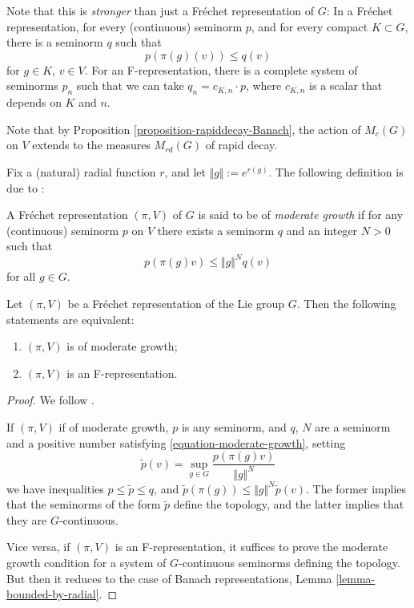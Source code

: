 Note that this is {\it stronger} than just a Fr\'echet representation of $G$: In a Fr\'echet representation, for every (continuous) seminorm $p$, and for every compact $K\subset G$, there is a seminorm $q$ such that 
$$ p(\pi(g) (v)) \le q(v)$$
for $g\in K$, $v\in V$. For an F-representation, there is a complete system of seminorms $p_n$ such that we can take $q_n=c_{K,n}\cdot p$, where $c_{K,n}$ is a scalar that depends on $K$ and $n$.

Note that by Proposition \ref{proposition-rapiddecay-Banach}, the action of $M_c(G)$ on $V$ extends to the measures $M_{rd}(G)$ of rapid decay. 

Fix a (natural) radial function $r$, and let $\Vert g\Vert:= e^{r(g)}$. The following definition is due to \cite{Casselman-canonicalextensions}:

\begin{definition}
\label{definition-moderate-growth}
A Fr\'echet representation $(\pi,V)$ of $G$ is said to be of {\it moderate
growth} if for any (continuous) seminorm $p$ on $V$ there exists a seminorm $q$
and an integer $N > 0$ such that
\begin{equation}
\label{equation-moderate-growth}
p(\pi(g)v) \le \Vert g\Vert^N q(v)
\end{equation}
for all $g \in G$.
\end{definition}

\begin{lemma}
\label{lemma-F-moderate-growth} 
 Let $(\pi, V)$ be a Fr\'echet representation of the Lie group
$G$. Then the following statements are equivalent:
\begin{enumerate}
 \item  $(\pi,V)$ is of moderate growth;
 \item $(\pi, V)$ is an F-representation.
\end{enumerate}
\end{lemma}

\begin{proof}
We follow \cite[Lemma 2.10]{Bernstein-Kroetz}.

If $(\pi, V)$ if of moderate growth, $p$ is any seminorm, and $q$, $N$ are a seminorm and a positive number satisfying \eqref{equation-moderate-growth}, setting 
$$ \tilde p (v) = \sup_{g\in G} \frac{p(\pi(g)v)}{\Vert g\Vert^N}$$ 
we have inequalities $p\le \tilde p\le q$, and $\tilde p(\pi(g)) \le \Vert g\Vert^N \tilde p(v)$. The former implies that the seminorms of the form $\tilde p$ define the topology, and the latter implies that they are $G$-continuous.

Vice versa, if $(\pi, V)$ is an F-representation, it suffices to prove the moderate growth condition for a system of $G$-continuous seminorms defining the topology. But then it reduces to the case of Banach representations, Lemma \ref{lemma-bounded-by-radial}. 
\end{proof}

